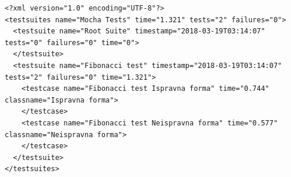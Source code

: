 \begin{lstlisting}[float=h]
<?xml version="1.0" encoding="UTF-8"?>
<testsuites name="Mocha Tests" time="1.321" tests="2" failures="0">
  <testsuite name="Root Suite" timestamp="2018-03-19T03:14:07" tests="0" failures="0" time="0">
  </testsuite>
  <testsuite name="Fibonacci test" timestamp="2018-03-19T03:14:07" tests="2" failures="0" time="1.321">
    <testcase name="Fibonacci test Ispravna forma" time="0.744" classname="Ispravna forma">
    </testcase>
    <testcase name="Fibonacci test Neispravna forma" time="0.577" classname="Neispravna forma">
    </testcase>
  </testsuite>
</testsuites>
\end{lstlisting}
